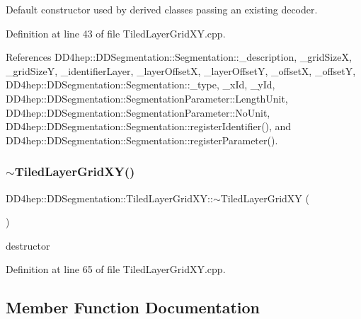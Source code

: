 Default constructor used by derived classes passing an existing decoder. 



Definition at line 43 of file Tiled\+Layer\+Grid\+X\+Y.\+cpp.



References D\+D4hep\+::\+D\+D\+Segmentation\+::\+Segmentation\+::\+\_\+description, \+\_\+grid\+SizeX, \+\_\+grid\+SizeY, \+\_\+identifier\+Layer, \+\_\+layer\+OffsetX, \+\_\+layer\+OffsetY, \+\_\+offsetX, \+\_\+offsetY, D\+D4hep\+::\+D\+D\+Segmentation\+::\+Segmentation\+::\+\_\+type, \+\_\+x\+Id, \+\_\+y\+Id, D\+D4hep\+::\+D\+D\+Segmentation\+::\+Segmentation\+Parameter\+::\+Length\+Unit, D\+D4hep\+::\+D\+D\+Segmentation\+::\+Segmentation\+Parameter\+::\+No\+Unit, D\+D4hep\+::\+D\+D\+Segmentation\+::\+Segmentation\+::register\+Identifier(), and D\+D4hep\+::\+D\+D\+Segmentation\+::\+Segmentation\+::register\+Parameter().

\hypertarget{class_d_d4hep_1_1_d_d_segmentation_1_1_tiled_layer_grid_x_y_a03eeb88ffc324d56f3bfac3abb707e62}{}\label{class_d_d4hep_1_1_d_d_segmentation_1_1_tiled_layer_grid_x_y_a03eeb88ffc324d56f3bfac3abb707e62} 
\subsubsection{\texorpdfstring{$\sim$\+Tiled\+Layer\+Grid\+X\+Y()}{~TiledLayerGridXY()}}
{\footnotesize\ttfamily D\+D4hep\+::\+D\+D\+Segmentation\+::\+Tiled\+Layer\+Grid\+X\+Y\+::$\sim$\+Tiled\+Layer\+Grid\+XY (\begin{DoxyParamCaption}{ }\end{DoxyParamCaption})\hspace{0.3cm}{\ttfamily [virtual]}}



destructor 



Definition at line 65 of file Tiled\+Layer\+Grid\+X\+Y.\+cpp.



\subsection{Member Function Documentation}
\hypertarget{class_d_d4hep_1_1_d_d_segmentation_1_1_tiled_layer_grid_x_y_ad02cf70affc62612a40583aaca30abd8}{}\label{class_d_d4hep_1_1_d_d_segmentation_1_1_tiled_layer_grid_x_y_ad02cf70affc62612a40583aaca30abd8} 
